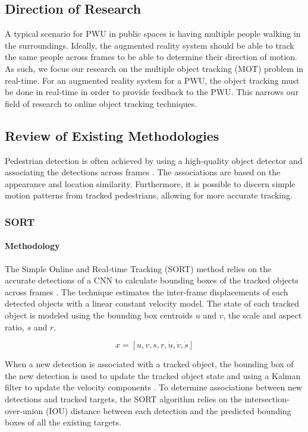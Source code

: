 \subsection{Direction of Research}
 A typical scenario for PWU in public spaces is having multiple people walking in the surroundings. Ideally, the augmented reality system should be able to track the same people across frames to be able to determine their direction of motion. As such, we focus our research on the multiple object tracking (MOT) problem in real-time. For an augmented reality system for a PWU, the object tracking must be done in real-time in order to provide feedback to the PWU. This narrows our field of research to online object tracking techniques.
 
\subsection{Review of Existing Methodologies} \label{sec:objectTrack}
 Pedestrian detection is often achieved by using a high-quality object detector and associating the detections across frames \cite{Dicle2013}. The associations are based on the appearance and location similarity. Furthermore, it is possible to discern simple motion patterns from tracked pedestrians, allowing for more accurate tracking.
 
\subsubsection{SORT}
\paragraph{Methodology} The Simple Online and Real-time Tracking (SORT) method relies on the accurate detections of a CNN to calculate bounding boxes of the tracked objects across frames \cite{Bewley2016}. The technique estimates the inter-frame displacements of each detected objects with a linear constant velocity model. The state of each tracked object is modeled using the bounding box centroids $u$ and $v$, the scale and aspect ratio, $s$ and $r$.

\[x = [u, v, s, r, \dot{u}, \dot{v}, \dot{s}] \]

When a new detection is associated with a tracked object, the bounding box of the new detection is used to update the tracked object state and using a Kalman filter to update the velocity components \cite{Kalman1961}. To determine associations between new detections and tracked targets, the SORT algorithm relies on the intersection-over-union (IOU) distance between each detection and the predicted bounding boxes of all the existing targets.


